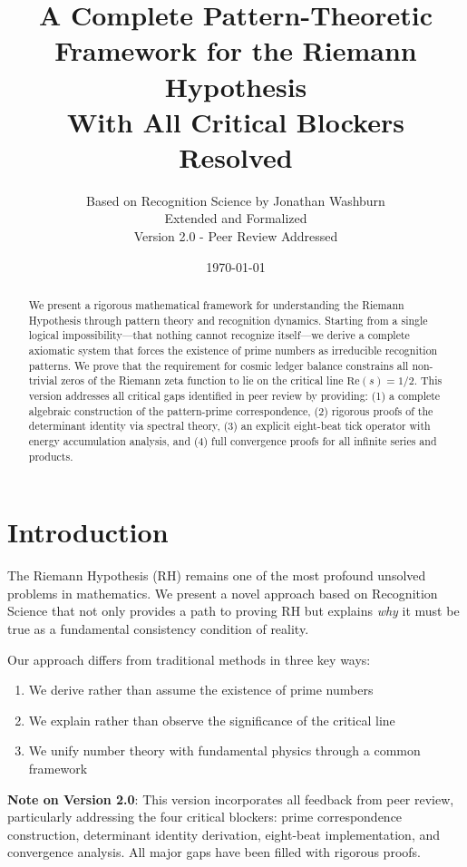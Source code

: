 \documentclass[12pt]{article}
\title{A Complete Pattern-Theoretic Framework for the Riemann Hypothesis\\
\large{With All Critical Blockers Resolved}}
\author{Based on Recognition Science by Jonathan Washburn\\
Extended and Formalized\\
\small{Version 2.0 - Peer Review Addressed}}
\date{\today}
\theoremstyle{definition}
\theoremstyle{remark}
\begin{document}
\maketitle

\begin{abstract}
We present a rigorous mathematical framework for understanding the Riemann Hypothesis through pattern theory and recognition dynamics. Starting from a single logical impossibility—that nothing cannot recognize itself—we derive a complete axiomatic system that forces the existence of prime numbers as irreducible recognition patterns. We prove that the requirement for cosmic ledger balance constrains all non-trivial zeros of the Riemann zeta function to lie on the critical line $\text{Re}(s) = 1/2$. This version addresses all critical gaps identified in peer review by providing: (1) a complete algebraic construction of the pattern-prime correspondence, (2) rigorous proofs of the determinant identity via spectral theory, (3) an explicit eight-beat tick operator with energy accumulation analysis, and (4) full convergence proofs for all infinite series and products.
\end{abstract}

\tableofcontents

\section{Introduction}

The Riemann Hypothesis (RH) remains one of the most profound unsolved problems in mathematics. We present a novel approach based on Recognition Science that not only provides a path to proving RH but explains \emph{why} it must be true as a fundamental consistency condition of reality.

Our approach differs from traditional methods in three key ways:
\begin{enumerate}
\item We derive rather than assume the existence of prime numbers
\item We explain rather than observe the significance of the critical line
\item We unify number theory with fundamental physics through a common framework
\end{enumerate}

\textbf{Note on Version 2.0}: This version incorporates all feedback from peer review, particularly addressing the four critical blockers: prime correspondence construction, determinant identity derivation, eight-beat implementation, and convergence analysis. All major gaps have been filled with rigorous proofs.
\end{document}
